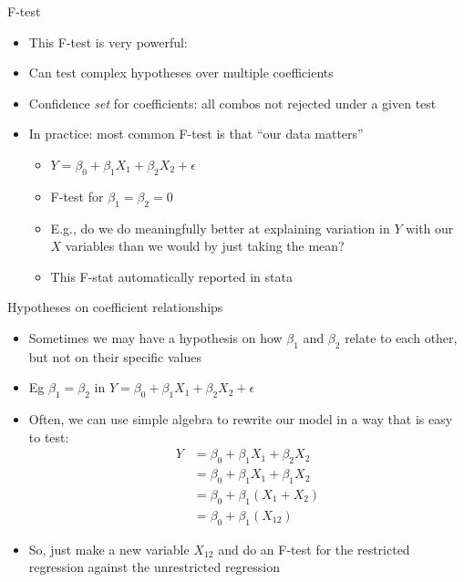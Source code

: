\documentclass[aspectratio=169]{beamer}
\begin{document}
\begin{frame}{F-test}
    \begin{itemize}
        \item This F-test is very powerful:
        \item Can test complex hypotheses over multiple coefficients
        \item Confidence \textit{set} for coefficients: all combos not rejected under a given test 
        \item In practice: most common F-test is that ``our data matters''
        \begin{itemize}
            \item $Y = \beta_0 + \beta_1 X_1 + \beta_2 X_2 + \epsilon $
            \item F-test for $\beta_1 = \beta_2 = 0 $
            \item E.g., do we do meaningfully better at explaining variation in $Y$ with our $X$ variables than we would by just taking the mean?
            \item This F-stat automatically reported in stata
        \end{itemize}
    \end{itemize}
\end{frame}

\begin{frame}{Hypotheses on coefficient relationships}
    \begin{itemize}
        \item Sometimes we may have a hypothesis on how $\beta_1$ and $\beta_2$ relate to each other, but not on their specific values
        \item Eg $\beta_1 = \beta_2 $ in $Y = \beta_0 + \beta_1 X_1 + \beta_2 X_2 + \epsilon $
        \item Often, we can use simple algebra to rewrite our model in a way that is easy to test:
        \begin{equation*}
            \begin{split}
                Y &= \beta_0 + \beta_1 X_1 + \beta_2 X_2 \\
                &= \beta_0 + \beta_1 X_1 + \beta_1 X_2 \\
                &= \beta_0 + \beta_1 \left( X_1 + X_2 \right) \\
                &= \beta_0 + \beta_1 \left( X_{12} \right)
            \end{split}
        \end{equation*}
        \item So, just make a new variable $X_{12}$ and do an F-test for the restricted regression against the unrestricted regression
    \end{itemize}
\end{frame}
\end{document}
